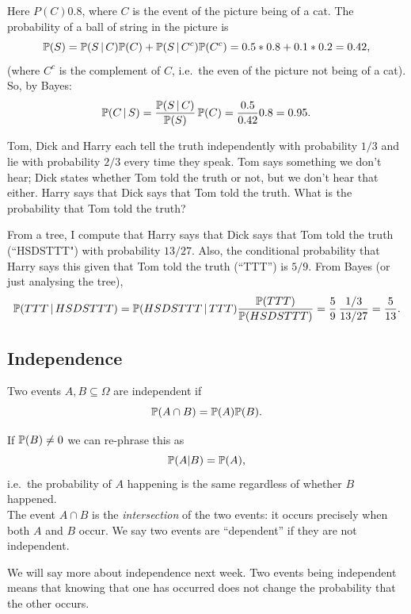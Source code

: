 \begin{sol}
Here $P(C)0.8$, where $C$ is the event of the picture being of a cat. The probability of a ball of string in the picture is 
 \[
   {\mathbb P}(S) = {\mathbb P}(S \, | \, C) {\mathbb P}(C) + {\mathbb P}(S \, | \, C^c) {\mathbb P}(C^c) = 
    0.5 * 0.8 + 0.1 * 0.2 = 0.42,  
 \]
(where $C^c$ is the complement of $C$, i.e.\ the even of the picture not being of a cat).   So, by Bayes: 
 \[
   {\mathbb P}(C \, | \, S) = \frac{{\mathbb P}(S \, | \, C)}{{\mathbb P}(S)} \,{\mathbb P}(C) =
       \frac{0.5}{0.42} 0.8 = 0.95.
 \]
\end{sol}

\begin{exer}
Tom, Dick and Harry each tell the truth independently with probability $1/3$ and lie with probability $2/3$ every time they speak. Tom says something we don't hear; Dick states whether Tom told the truth or not, but we don't hear that either. Harry says that Dick says that Tom told the truth.  What is the probability that Tom told the truth? 
\end{exer}

\begin{sol}
From a tree, I compute that Harry says that Dick says that Tom told the truth (``HSDSTTT") with probability $13/27$. Also, the conditional probability that Harry says this given that Tom told the truth (``TTT'') is $5/9$. From Bayes (or just analysing the tree),
 \[
   {\mathbb P}(TTT \, | \, HSDSTTT ) = {\mathbb P}( HSDSTTT \, | \, TTT) \frac{{\mathbb P}(TTT)}{{\mathbb P}(HSDSTTT)} = \frac59 \, \frac{1/3}{13/27} = \frac5{13}. 
 \]
\end{sol}

\subsection{Independence}
\begin{defn}
Two events $A,B \subseteq \Omega$ are independent if
\[ {\mathbb P}(A \cap B) = {\mathbb P}(A) {\mathbb P}(B).\]
\end{defn}
\noindent If ${\mathbb P}(B) \neq 0$ we can re-phrase this as
\[ {\mathbb P}(A \vert B) = {\mathbb P}(A),\]
i.e.\ the probability of $A$ happening is the same regardless of whether $B$ happened. \\ \linebreak
\noindent
The event $A \cap B$ is the \emph{intersection} of the two events: it occurs precisely when both $A$ and $B$ occur. We say two events are ``dependent'' if they are not independent. 

We will say more about independence next week.  Two events being independent means that knowing that one has occurred does not change the probability that the other occurs.  

